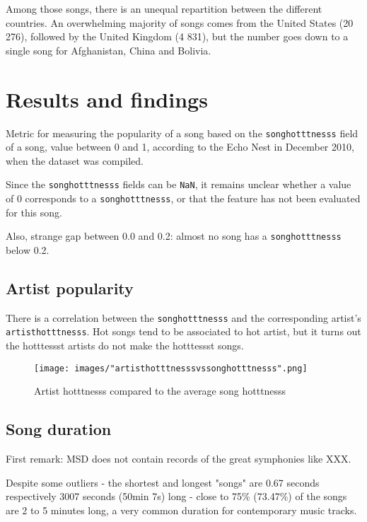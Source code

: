 \documentclass[11pt]{article}
\renewcommand\_{\textunderscore\allowbreak}
\begin{document}
Among those songs, there is an unequal repartition between the different countries.
An overwhelming majority of songs comes from the United States (20 276), followed by the United Kingdom (4 831), but the number goes down to a single song for Afghanistan, China and Bolivia.


\section{Results and findings}
Metric for measuring the popularity of a song based on the \texttt{song\_hotttnesss} field of a song, value between 0 and 1, according to the Echo Nest in December 2010, when the dataset was compiled.

Since the \texttt{song\_hotttnesss} fields can be \texttt{NaN}, it remains unclear whether a value of 0 corresponds to a \texttt{song\_hotttnesss}, or that the feature has not been evaluated for this song. 

Also, strange gap between 0.0 and 0.2: almost no song has a \texttt{song\_hotttnesss} below 0.2.


\subsection{Artist popularity}
There is a correlation between the \texttt{song\_hotttnesss} and the corresponding artist's \texttt{artist\_hotttnesss}.
Hot songs tend to be associated to hot artist, but it turns out the hotttessst artists do not make the hotttessst songs.

\begin{figure}[h!]
\centering
\captionsetup{width=1.0\textwidth}
\texttt{[image: images/"artist\_hotttnesss\_vs\_song\_hotttnesss".png]}
\caption{Artist hotttnesss compared to the average song hotttnesss}
\label{fig:artist_hotttnesss}
\end{figure}



\subsection{Song duration}
First remark: MSD does not contain records of the great symphonies like XXX. 

Despite some outliers - the shortest and longest "songs" are 0.67 seconds respectively 3007 seconds (50min 7s) long - close to 75\% (73.47\%) of the songs are 2 to 5 minutes long, a very common duration for contemporary music tracks.
\end{document}
